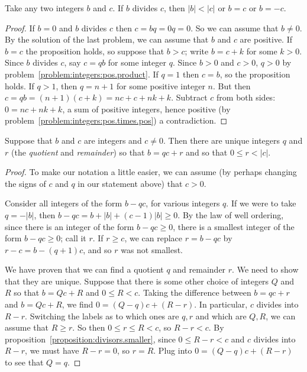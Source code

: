 \begin{proposition}\label{proposition:divisors.smaller}
Take any two integers \(b\) and \(c\).
If \(b\) divides \(c\), then \(|b| < |c|\) or \(b=c\) or \(b=-c\).
\end{proposition}
\begin{proof}
If \(b=0\) and \(b\) divides \(c\) then \(c=bq=0q=0\).
So we can assume that \(b\ne 0\).
By the solution of the last problem, we can assume that \(b\) and \(c\) are positive.
If \(b=c\) the proposition holds, so suppose that \(b>c\); write \(b=c+k\) for some \(k>0\).
Since \(b\) divides \(c\), say \(c=qb\) for some integer \(q\).
Since \(b>0\) and \(c>0\), \(q>0\) by problem~\vref{problem:integers:pos.product}.
If \(q=1\) then \(c=b\), so the proposition holds.
If \(q>1\), then \(q=n+1\) for some positive integer \(n\).
But then \(c=qb=(n+1)(c+k)=nc+c+nk+k\).
Subtract \(c\) from both sides: \(0=nc+nk+k\), a sum of positive integers, hence positive (by problem~\vref{problem:integers:pos.times.pos}) a contradiction.
\end{proof}
\begin{theorem}
Suppose that \(b\) and \(c\) are integers and \(c \ne 0\).
Then there are unique integers \(q\) and \(r\) (the \emph{quotient} and \emph{remainder}) so that \(b=qc+r\) and so that \(0 \le r < |c|\).
\end{theorem}
\begin{proof}
To make our notation a little easier, we can assume (by perhaps changing the signs of \(c\) and \(q\) in our statement above) that \(c>0\).

Consider all integers of the form \(b-qc\), for various integers \(q\).
If we were to take \(q=-|b|\), then \(b-qc = b+|b| + (c-1)|b| \ge 0\).
By the law of well ordering, since there is an integer of the form \(b-qc \ge 0\), there is a smallest integer of the form \(b-qc \ge 0\); call it \(r\).
If \(r \ge c\), we can replace \(r=b-qc\) by \(r-c=b-(q+1)c\), and so \(r\) was not smallest.

We have proven that we can find a quotient \(q\) and remainder \(r\).
We need to show that they are unique.
Suppose that there is some other choice of integers \(Q\) and \(R\) so that \(b=Qc+R\) and \(0 \le R < c\).
Taking the difference between \(b=qc+r\) and \(b=Qc+R\), we find \(0=(Q-q)c+(R-r)\).
In particular, \(c\) divides into \(R-r\).
Switching the labels as to which ones are \(q,r\) and which are \(Q,R\), we can assume that \(R \ge r\).
So then \(0 \le r \le R < c\), so \(R-r < c\).
By proposition~\vref{proposition:divisors.smaller}, since \(0 \le R-r < c\) and \(c\) divides into \(R-r\), we must have \(R-r=0\), so \(r=R\).
Plug into \(0=(Q-q)c+(R-r)\) to see that \(Q=q\).
\end{proof}
